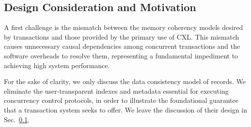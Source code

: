 \subsection{Design Consideration and Motivation}

A first challenge is the mismatch between the memory coherency models desired by transactions and those provided by the primary use of CXL. This mismatch causes unnecessary causal dependencies among concurrent transactions and the software overheads to resolve them, representing a fundamental impediment to achieving high system performance.




For the sake of clarity, we only discuss the data consistency model of records. We eliminate the user-transparent indexes and metadata essential for executing concurrency control protocols, in order to illustrate the foundational guarantee that a transaction system seeks to offer. We leave the discussion of their design in Sec.~\ref{}.





